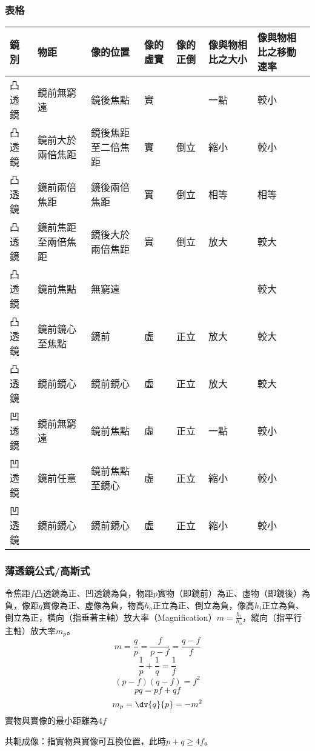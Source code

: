 \documentclass[a4paper,12pt]{report}
\begin{document}
\subsubsection{表格}
\bct\bfH\ctr
\begin{tabular}{|p{0.05\tw}|p{0.15\tw}|p{0.15\tw}|p{0.05\tw}|p{0.05\tw}|p{0.1\tw}|p{0.1\tw}|}
\hline
鏡別  & 物距        & 像的位置      & 像的虛實 & 像的正倒 & 像與物相比之大小 & 像與物相比之移動速率 \\\hline
凸透鏡 & 鏡前無窮遠     & 鏡後焦點      & 實    &      & 一點       & 較小         \\\hline
凸透鏡 & 鏡前大於兩倍焦距  & 鏡後焦距至二倍焦距 & 實    & 倒立   & 縮小       & 較小         \\\hline
凸透鏡 & 鏡前兩倍焦距    & 鏡後兩倍焦距    & 實    & 倒立   & 相等       & 相等         \\\hline
凸透鏡 & 鏡前焦距至兩倍焦距 & 鏡後大於兩倍焦距  & 實    & 倒立   & 放大       & 較大         \\\hline
凸透鏡 & 鏡前焦點      & 無窮遠       &      &      &          & 較大         \\\hline
凸透鏡 & 鏡前鏡心至焦點   & 鏡前        & 虛    & 正立   & 放大       & 較大         \\\hline
凸透鏡 & 鏡前鏡心      & 鏡前鏡心      & 虛    & 正立   & 放大       & 較大         \\\hline
凹透鏡 & 鏡前無窮遠     & 鏡前焦點      & 虛    & 正立   & 一點       & 較小         \\\hline
凹透鏡 & 鏡前任意      & 鏡前焦點至鏡心   & 虛    & 正立   & 縮小       & 較小         \\\hline
凹透鏡 & 鏡前鏡心      & 鏡前鏡心      & 虛    & 正立   & 縮小       & 較小  \\\hline      
\end{tabular}
\ef\FB\ect
\subsubsection{薄透鏡公式/高斯式}
令焦距$f$凸透鏡為正、凹透鏡為負，物距$p$實物（即鏡前）為正、虛物（即鏡後）為負，像距$q$實像為正、虛像為負，物高$h_o$正立為正、倒立為負，像高$h_i$正立為負、倒立為正，橫向（指垂著主軸）放大率（Magnification）$m=\frac{h_i}{h_o}$，縱向（指平行主軸）放大率$m_p$。
\[m=\frac{q}{p}=\frac{f}{p-f}=\frac{q-f}{f}\]
\[\frac{1}{p}+\frac{1}{q}=\frac{1}{f}\]
\[(p-f)(q-f)=f^2\]
\[pq=pf+qf\]
\[m_p=\dv{q}{p}=-m^2\]
實物與實像的最小距離為$4f$

共軛成像：指實物與實像可互換位置，此時$p+q\geq 4f$。
\end{document}
